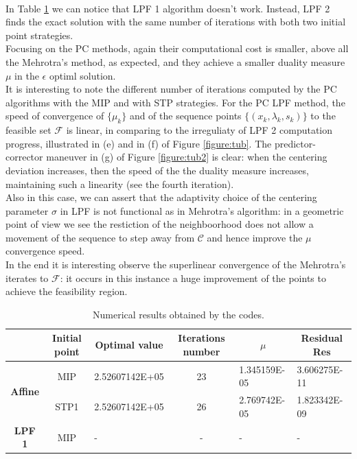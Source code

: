 \documentclass[a4paper,10 pt,titlepage,twoside]{book}
\theoremstyle{plain}
\theoremstyle{definition}
\theoremstyle{remark}
\begin{document}
{{\\In Table \ref{table:TP} we can notice that LPF 1 algorithm doesn't work. Instead, LPF 2 finds the exact solution with the same number of iterations with both two initial point strategies. \\
Focusing on the PC methods, again their computational cost is smaller, above all the Mehrotra's method, as expected, and they achieve a smaller duality measure $\mu$ in the $\epsilon$ optiml solution.\\ It is interesting to note the different number of iterations computed by the PC algorithms with the MIP and with STP strategies. For the PC LPF method, the speed of convergence of $\{\mu_{k}\}$ and of the sequence points $\{(x_{k},\lambda_{k},s_{k})\}$ to the feasible set $\mathcal{F}$ is linear, in comparing to the irreguliaty of LPF 2 computation progress, illustrated in (e) and in (f) of Figure \ref{figure:tub}.
The predictor-corrector maneuver in (g) of Figure \ref{figure:tub2} is clear: when the centering deviation increases, then the speed of the the duality measure increases, maintaining such a linearity (see the fourth iteration).\\
Also in this case, we can assert that the adaptivity choice of the centering parameter $\sigma$ in LPF is not functional as in Mehrotra's algorithm: in a geometric point of view we see the restiction of the neighboorhood does not allow a movement of the sequence to step away from $\mathcal{C}$ and hence improve the $\mu$ convergence speed.\\
In the end it is interesting observe the superlinear convergence of the Mehrotra's iterates to $\mathcal{F}$: it occurs in this instance a huge improvement of the points to achieve the feasibility region.
\begin{table}[]\caption{\label{table:TP}Numerical results obtained by the codes.}
	\begin{tabular}{cclcll}
		\hline		\textbf{} & \textbf{Initial point} & \multicolumn{1}{c}{\textbf{Optimal value}} & \textbf{Iterations number} & \multicolumn{1}{c}{\textbf{$\mu$}} & \multicolumn{1}{c}{\textbf{Residual} Res} \\ \hline
		\multicolumn{1}{c|}{\multirow{2}{*}{\textbf{Affine}}} & MIP & 2.52607142E+05 & 23 & 1.345159E-05 & 3.606275E-11 \\
		\multicolumn{1}{c|}{} & STP1 & 2.52607142E+05 & 26 & 2.769742E-05 & 1.823342E-09 \\ \hline
		\multicolumn{1}{c|}{\multirow{2}{*}{\textbf{LPF 1}}} & MIP & - & - & - & - \\

\end{tabular}
\end{table}}}
\end{document}
